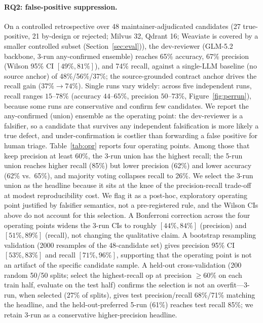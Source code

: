 \documentclass[sigconf]{acmart}
\begin{document}
\paragraph{RQ2: false-positive suppression.}
On a controlled retrospective over 48 maintainer-adjudicated candidates (27 true-positive, 21 by-design or rejected; Milvus 32, Qdrant 16; Weaviate is covered by a smaller controlled subset (Section~\ref{sec:eval})), the dev-reviewer (GLM-5.2 backbone, 3-run any-confirmed ensemble) reaches 65\% accuracy, 67\% precision (Wilson 95\% CI $[49\%, 81\%]$), and 74\% recall, against a single-LLM baseline (no source anchor) of 48\%/56\%/37\%; the source-grounded contract anchor drives the recall gain ($37\%\to74\%$). Single runs vary widely: across five independent runs, recall ranges $15$--$78\%$ (accuracy $44$--$65\%$, precision $50$--$73\%$, Figure~\ref{fig:perrun}), because some runs are conservative and confirm few candidates. We report the any-confirmed (union) ensemble as the operating point: the dev-reviewer is a falsifier, so a candidate that survives any independent falsification is more likely a true defect, and under-confirmation is costlier than forwarding a false positive for human triage. Table~\ref{tab:opr} reports four operating points. Among those that keep precision at least 60\%, the 3-run union has the highest recall; the 5-run union reaches higher recall (85\%) but lower precision (62\%) and lower accuracy (62\% vs.\ 65\%), and majority voting collapses recall to 26\%. We select the 3-run union as the headline because it sits at the knee of the precision-recall trade-off at modest reproducibility cost. We flag it as a post-hoc, exploratory operating point justified by falsifier semantics, not a pre-registered rule, and the Wilson CIs above do not account for this selection. A Bonferroni correction across the four operating points widens the 3-run CIs to roughly $[44\%, 84\%]$ (precision) and $[51\%, 89\%]$ (recall), not changing the qualitative claim. A bootstrap resampling validation (2000 resamples of the 48-candidate set) gives precision 95\% CI $[53\%, 83\%]$ and recall $[71\%, 96\%]$, supporting that the operating point is not an artifact of the specific candidate sample. A held-out cross-validation (200 random 50/50 splits; select the highest-recall op at precision $\geq 60\%$ on each train half, evaluate on the test half) confirms the selection is not an overfit---3-run, when selected (27\% of splits), gives test precision/recall 68\%/71\% matching the headline, and the held-out-preferred 5-run (61\%) reaches test recall 85\%; we retain 3-run as a conservative higher-precision headline.
\end{document}
